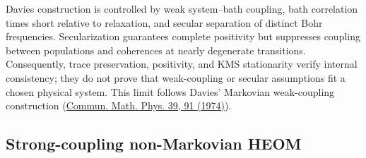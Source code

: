 \documentclass[11pt]{article}
\begin{document}
Davies construction is controlled by weak system--bath coupling, bath correlation
times short relative to relaxation, and secular separation of distinct Bohr
frequencies. Secularization guarantees complete positivity but suppresses coupling
between populations and coherences at nearly degenerate transitions. Consequently,
trace preservation, positivity, and KMS stationarity verify internal consistency;
they do not prove that weak-coupling or secular assumptions fit a chosen physical
system. This limit follows Davies' Markovian weak-coupling construction
(\href{https://doi.org/10.1007/BF01608389}{Commun. Math. Phys. 39, 91 (1974)}).

\subsection{Strong-coupling non-Markovian HEOM}
\end{document}
